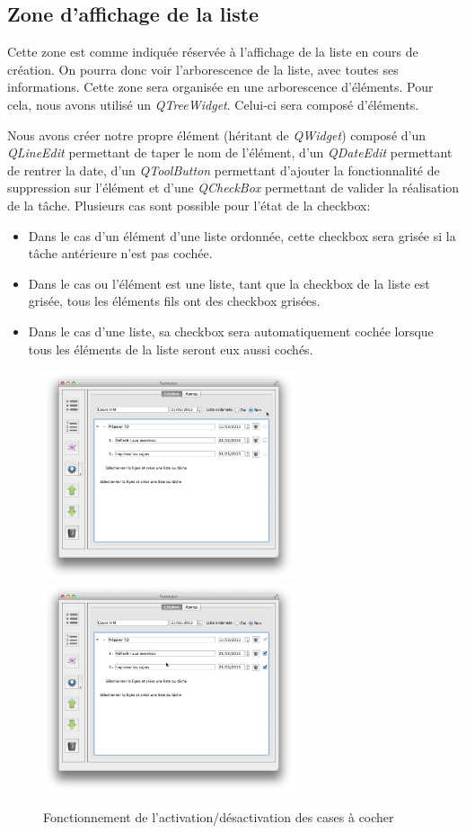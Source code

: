 \documentclass[a4paper,10pt]{article}
\begin{document}
\subsection{Zone d'affichage de la liste}
Cette zone est comme indiquée réservée à l'affichage de la liste en cours de création. On pourra donc voir l'arborescence de la liste, avec toutes ses informations.
Cette zone sera organisée en une arborescence d'éléments. Pour cela, nous avons utilisé un \textit{QTreeWidget}. Celui-ci sera composé d'éléments.

Nous avons créer notre propre élément (héritant de \textit{QWidget}) composé d'un \textit{QLineEdit} permettant de taper le nom de l'élément, d'un \textit{QDateEdit} permettant de rentrer la date, d'un \textit{QToolButton} permettant d'ajouter la fonctionnalité de suppression sur l'élément et d'une \textit{QCheckBox} permettant de valider la réalisation de la tâche.
Plusieurs cas sont possible pour l'état de la checkbox:
\begin{itemize}
\item Dans le cas d'un élément d'une liste ordonnée, cette checkbox sera grisée si la tâche antérieure n'est pas cochée.
\item Dans le cas ou l'élément est une liste, tant que la checkbox de la liste est grisée, tous les éléments fils ont des checkbox grisées.
\item Dans le cas d'une liste, sa checkbox sera automatiquement cochée lorsque tous les éléments de la liste seront eux aussi cochés.
\end{itemize}
\begin{figure}[H]
    \center
    \includegraphics[width=7.4cm]{Images/caseDesactive.png}
    \includegraphics[width=7.4cm]{Images/checkboxListe.png}
    \caption{Fonctionnement de l'activation/désactivation des cases à cocher}
\end{figure}
\end{document}
